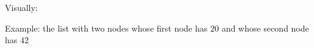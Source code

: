 
Visually:

\vspace{50pt}

Example: the list with two nodes whose first node has $20$ and whose second node
has $42$

\vspace{50pt}